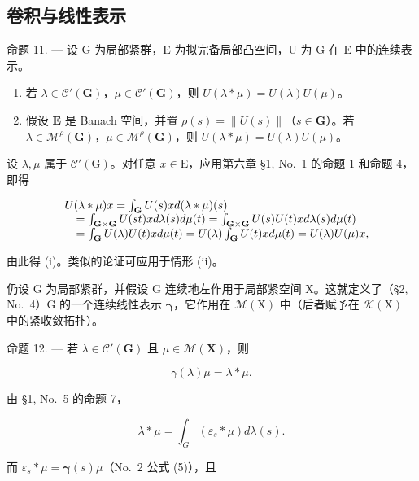 \subsection{卷积与线性表示}

命题 11. --- 设 G 为局部紧群，E 为拟完备局部凸空间，U 为 G 在 E 中的连续表示。

\begin{enumerate}
\def\labelenumi{(\roman{enumi})}
\item
  若 \(\lambda \in \mathcal{C}'(\mathbf{G})\)，\(\mu \in \mathcal{C}'(\mathbf{G})\)，则 \(U(\lambda * \mu) = U(\lambda)U(\mu)\)。
\item
  假设 \(\mathbf{E}\) 是 Banach 空间，并置 \(\rho(s) = \|U(s)\|\)（\(s\in\mathbf{G}\)）。若 \(\lambda\in\mathcal{M}^{\rho}(\mathbf{G})\)，\(\mu\in\mathcal{M}^{\rho}(\mathbf{G})\)，则 \(U(\lambda*\mu)=U(\lambda)U(\mu)\)。
\end{enumerate}

设 \(\lambda, \mu\) 属于 \(\mathcal{C}'(\mathrm{G})\)。对任意 \(x \in \mathrm{E}\)，应用第六章 §1, No.~1 的命题 1 和命题 4，即得

\[
\begin{array}{r l} & U (\lambda * \mu) x = \int_ {\mathbf {G}} U (s) x d (\lambda * \mu) (s) \\ & \quad = \int_ {\mathbf {G} \times \mathbf {G}} U (s t) x d \lambda (s) d \mu (t) = \int_ {\mathbf {G} \times \mathbf {G}} U (s) U (t) x d \lambda (s) d \mu (t) \\ & \quad = \int_ {\mathbf {G}} U (\lambda) U (t) x d \mu (t) = U (\lambda) \int_ {\mathbf {G}} U (t) x d \mu (t) = U (\lambda) U (\mu) x, \end{array}
\]

由此得 (i)。类似的论证可应用于情形 (ii)。

仍设 G 为局部紧群，并假设 G 连续地左作用于局部紧空间 X。这就定义了（§2, No.~4）G 的一个连续线性表示 \(\pmb{\gamma}\)，它作用在 \(\mathcal{M}(\mathrm{X})\) 中（后者赋予在 \(\mathcal{K}(\mathrm{X})\) 中的紧收敛拓扑）。

命题 12. --- 若 \(\lambda \in \mathcal{C}'(\mathbf{G})\) 且 \(\mu \in \mathcal{M}(\mathbf{X})\)，则

\[
\gamma (\lambda) \mu = \lambda * \mu .
\]

由 §1, No.~5 的命题 7，

\[
\lambda * \mu = \int_ {G} (\varepsilon_ {s} * \mu) d \lambda (s).
\]

而 \(\varepsilon_{s}*\mu = \pmb {\gamma}(s)\mu\)（No.~2 公式 (5)），且

